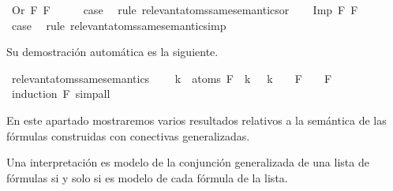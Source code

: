 \begin{isabellebody}
\isanewline
{}\isamarkupfalse%
\ {\isacharparenleft}Or\ F{}\ F{}{\isacharparenright}\isanewline
\ \ \isamarkupfalse%
\ \isamarkupfalse%
\ {\isacharquery}case\ \isamarkupfalse%
\ {\isacharparenleft}rule\ relevant{\isacharunderscore}atoms{\isacharunderscore}same{\isacharunderscore}semantics{\isacharunderscore}or{\isacharparenright}\isanewline
{}\isamarkupfalse%
\isanewline
\ \ \isamarkupfalse%
\ {\isacharparenleft}Imp\ F{}\ F{}{\isacharparenright}\isanewline
\ \ \isamarkupfalse%
\ \isamarkupfalse%
\ {\isacharquery}case\ \isamarkupfalse%
\ {\isacharparenleft}rule\ relevant{\isacharunderscore}atoms{\isacharunderscore}same{\isacharunderscore}semantics{\isacharunderscore}imp{\isacharparenright}\isanewline
{}\isamarkupfalse%
%
\endisatagproof
{\isafoldproof}%
%
\isadelimproof
%
\endisadelimproof
%
\begin{isamarkuptext}%
Su demostración automática es la siguiente.%
\end{isamarkuptext}\isamarkuptrue%
\isamarkupfalse%
\ relevant{\isacharunderscore}atoms{\isacharunderscore}same{\isacharunderscore}semantics{\isacharcolon}\ \isanewline
\ \ \ {\isachardoublequoteopen}{\isasymforall}k\ {\isasymin}\ atoms\ F{\isachardot}\ {\isasymA}\ k\ {\isacharequal}\ {\isasymA}\ k\ {\isasymLongrightarrow}\ {\isasymA}\ {\isasymTurnstile}\ F\ {\isasymlongleftrightarrow}\ {\isasymA}\ {\isasymTurnstile}\ F{\isachardoublequoteclose}\isanewline
%
\isadelimproof
\ \ %
\endisadelimproof
%
\isatagproof
{}\isamarkupfalse%
\ {\isacharparenleft}induction\ F{\isacharparenright}\ simp{\isacharunderscore}all%
\endisatagproof
{\isafoldproof}%
%
\isadelimproof
%
\endisadelimproof
%
\isadelimdocument
%
\endisadelimdocument
%
\isatagdocument
%
\isamarkuptrue%
%
\endisatagdocument
{\isafolddocument}%
%
\isadelimdocument
%
\endisadelimdocument
%
\begin{isamarkuptext}%
En este apartado mostraremos varios resultados relativos a la 
  semántica de las fórmulas construidas con conectivas generalizadas.

  \begin{lema}
    Una interpretación es modelo de la conjunción generalizada de una 
    lista de fórmulas si y solo si es modelo de cada fórmula de la
    lista.
  \end{lema}


\end{isamarkuptext}
\end{isabellebody}
